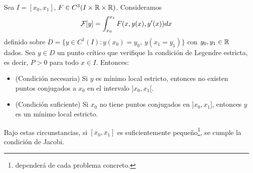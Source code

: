 \begin{teo}
    Sea $I=[x_0,x_1]$, $F\in C^3(I \times \mathbb{R} \times \mathbb{R})$. Consideramos 
    \begin{gather*}
        \mathcal{F}[y] = \int_{x_0}^{x_1} F(x,y(x),y'(x))dx
    \end{gather*}
    definido sobre $D = \{y\in C^1(I) : y(x_0)=y_0,\ y(x_1=y_1)\}$ con $y_0, y_1\in \mathbb{R}$ dados. Sea $y\in D$ un punto crítico que verifique la condición de Legendre estricta, es decir, $P>0$ para todo $x\in I$. Entonces:
    \begin{itemize}
        \item (Condición necesaria) Si $y$ es mínimo local estricto, entonces no existen puntos conjugados a $x_0$ en el intervalo $]x_0, x_1[$.
        \item (Condición suficiente) Si $x_0$ no tiene puntos conjugados en $]x_0,x_1]$, entonces $y$ es un mínimo local estricto.
    \end{itemize}
\end{teo}

\begin{coro}
    Bajo estas circunstancias, si $[x_0,x_1]$ es suficientemente pequeño\footnote{dependerá de cada problema concreto.}, se cumple la condición de Jacobi.
\end{coro}

